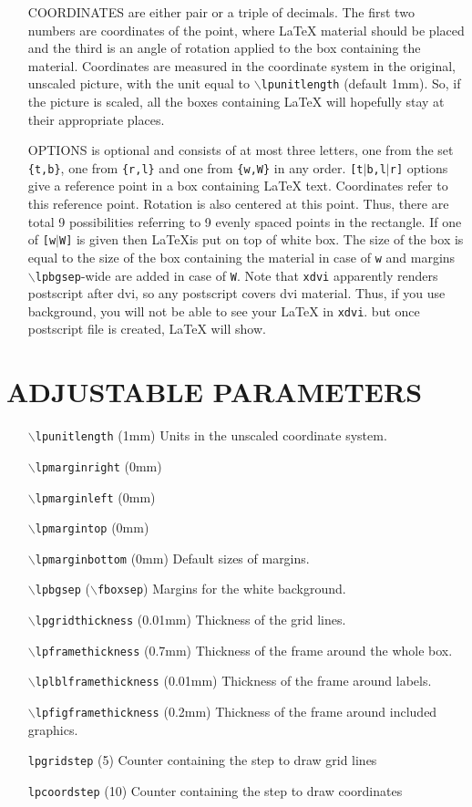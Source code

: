 \documentclass[10pt]{amsart}
\def\cmd#1{\texttt{$\backslash$#1}}
\let\latex=\LaTeX
\begin{document}
\begin{itemize}
\item[\sc COORDINATES] are either pair or a triple of decimals.  The
  first two numbers are coordinates of the point, where \latex{} material
  should be placed and the third is an angle of rotation applied to
  the box containing the material.  Coordinates are measured in the
  coordinate system in the original, unscaled picture, with the unit
  equal to \cmd{lpunitlength} (default 1mm). So, if the picture is
  scaled, all the boxes containing \latex{} will hopefully stay at their
  appropriate places.
\item[\sc OPTIONS] is optional and consists of at most three letters,
  one from the set {\tt\{t,b\}}, one from {\tt\{r,l\}} and one from {\tt\{w,W\}}
  in any
  order.  \texttt{[t$|$b,l$|$r]} options give a reference point in a box containing \latex{}
  text. Coordinates refer to this reference point.  Rotation is also
  centered at this point. Thus, there are total 9 possibilities
  referring to 9 evenly spaced points in the rectangle.
  If one of \texttt{[w$|$W]} is given then \latex is put on top of white box.
  The size of the box is equal to the size of the box containing the material in case of  \texttt{w}
  and margins \cmd{lpbgsep}-wide are added in case of \texttt{W}.
  Note that \texttt{xdvi} apparently renders postscript after dvi, so any postscript covers dvi material.
  Thus, if you use background, you will not be able to see your \latex{} in \texttt{xdvi}.
  but once postscript file is created, \latex{} will show.
\end{itemize}


\section{ADJUSTABLE PARAMETERS} 

  \begin{itemize}
  \item[\cmd{lpunitlength}] (1mm) Units in the unscaled coordinate
    system.
  \item[\cmd{lpmarginright}] (0mm)	
  \item[\cmd{lpmarginleft}] (0mm)
  \item[\cmd{lpmargintop}] (0mm)
  \item[\cmd{lpmarginbottom}] (0mm) Default sizes of margins.
  \item[\cmd{lpbgsep}] (\cmd{fboxsep}) Margins for the white background.
  \item[\cmd{lpgridthickness}] (0.01mm) Thickness of the grid lines.
  \item[\cmd{lpframethickness}] (0.7mm) Thickness of the frame around
    the whole box.
  \item[\cmd{lplblframethickness}] (0.01mm) Thickness of the frame
    around labels.
  \item[\cmd{lpfigframethickness}] (0.2mm) Thickness of the frame
    around included graphics.
  \item[\tt lpgridstep] (5) Counter containing the step to draw grid lines
  \item[\tt lpcoordstep] (10) Counter containing the step to draw coordinates
  \end{itemize}
\end{document}
